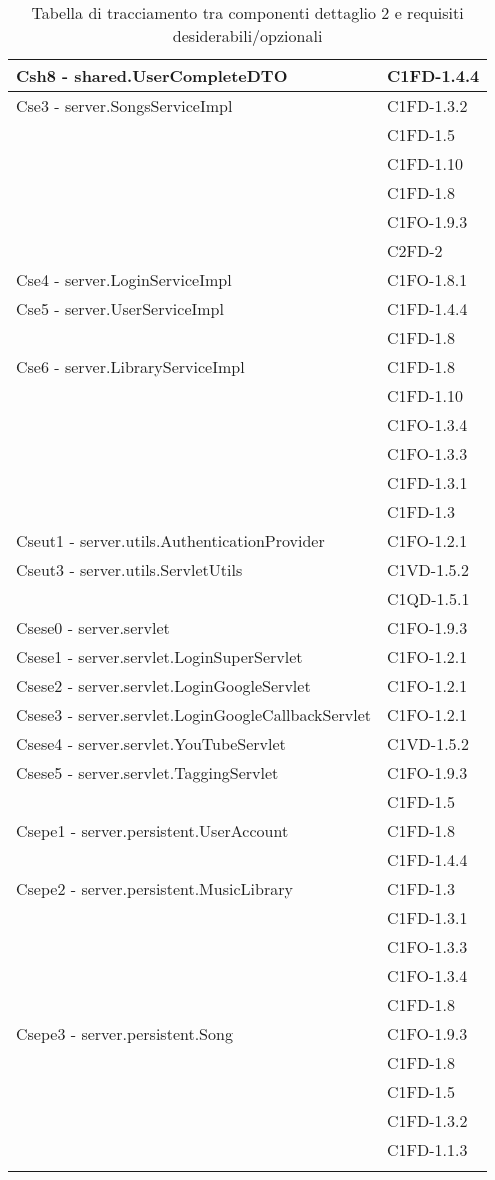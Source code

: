\begin{footnotesize}
\begin{longtable}[!h]{|l|l|}
Csh8 - shared.UserCompleteDTO & C1FD-1.4.4 \\\hline
Cse3 - server.SongsServiceImpl & C1FD-1.3.2 \\
& C1FD-1.5 \\
& C1FD-1.10 \\
& C1FD-1.8 \\
& C1FO-1.9.3 \\
& C2FD-2 \\\hline
Cse4 - server.LoginServiceImpl & C1FO-1.8.1 \\\hline
Cse5 - server.UserServiceImpl & C1FD-1.4.4 \\
& C1FD-1.8 \\\hline
Cse6 - server.LibraryServiceImpl & C1FD-1.8 \\
& C1FD-1.10 \\
& C1FO-1.3.4 \\
& C1FO-1.3.3 \\
& C1FD-1.3.1 \\
& C1FD-1.3 \\\hline
Cseut1 - server.utils.AuthenticationProvider & C1FO-1.2.1 \\\hline
Cseut3 - server.utils.ServletUtils & C1VD-1.5.2 \\
& C1QD-1.5.1 \\\hline
Csese0 - server.servlet & C1FO-1.9.3 \\\hline
Csese1 - server.servlet.LoginSuperServlet &  C1FO-1.2.1 \\\hline
Csese2 - server.servlet.LoginGoogleServlet & C1FO-1.2.1 \\\hline
Csese3 - server.servlet.LoginGoogleCallbackServlet & C1FO-1.2.1 \\\hline
Csese4 - server.servlet.YouTubeServlet & C1VD-1.5.2 \\
Csese5 - server.servlet.TaggingServlet & C1FO-1.9.3 \\
& C1FD-1.5 \\\hline
Csepe1 - server.persistent.UserAccount & C1FD-1.8 \\
& C1FD-1.4.4 \\\hline
Csepe2 - server.persistent.MusicLibrary & C1FD-1.3 \\
& C1FD-1.3.1 \\
& C1FO-1.3.3 \\
& C1FO-1.3.4 \\
& C1FD-1.8 \\\hline
Csepe3 - server.persistent.Song & C1FO-1.9.3 \\
& C1FD-1.8 \\
& C1FD-1.5 \\
& C1FD-1.3.2 \\
& C1FD-1.1.3 \\\hline
\caption{Tabella di tracciamento tra componenti dettaglio 2 e requisiti
desiderabili/opzionali}
\end{longtable}
\end{footnotesize}

